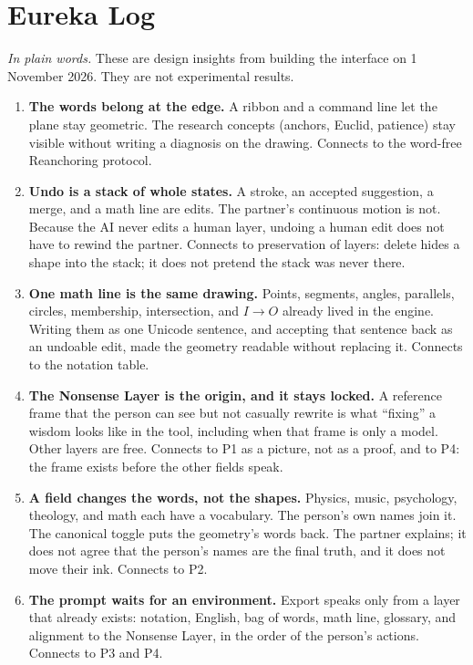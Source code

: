 \documentclass[11pt]{article}
\begin{document}
\section*{Eureka Log}
\textit{In plain words.} These are design insights from building the interface on 1 November 2026. They are not experimental results.

\begin{enumerate}[leftmargin=1.2em]
\item \textbf{The words belong at the edge.} A ribbon and a command line let the plane stay geometric. The research concepts (anchors, Euclid, patience) stay visible without writing a diagnosis on the drawing. Connects to the word-free Reanchoring protocol.
\item \textbf{Undo is a stack of whole states.} A stroke, an accepted suggestion, a merge, and a math line are edits. The partner's continuous motion is not. Because the AI never edits a human layer, undoing a human edit does not have to rewind the partner. Connects to preservation of layers: delete hides a shape into the stack; it does not pretend the stack was never there.
\item \textbf{One math line is the same drawing.} Points, segments, angles, parallels, circles, membership, intersection, and $I \to O$ already lived in the engine. Writing them as one Unicode sentence, and accepting that sentence back as an undoable edit, made the geometry readable without replacing it. Connects to the notation table.
\item \textbf{The Nonsense Layer is the origin, and it stays locked.} A reference frame that the person can see but not casually rewrite is what ``fixing'' a wisdom looks like in the tool, including when that frame is only a model. Other layers are free. Connects to P1 as a picture, not as a proof, and to P4: the frame exists before the other fields speak.
\item \textbf{A field changes the words, not the shapes.} Physics, music, psychology, theology, and math each have a vocabulary. The person's own names join it. The canonical toggle puts the geometry's words back. The partner explains; it does not agree that the person's names are the final truth, and it does not move their ink. Connects to P2.
\item \textbf{The prompt waits for an environment.} Export speaks only from a layer that already exists: notation, English, bag of words, math line, glossary, and alignment to the Nonsense Layer, in the order of the person's actions. Connects to P3 and P4.

\end{enumerate}
\end{document}
